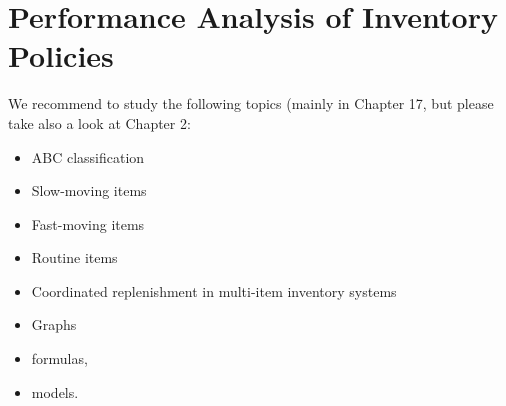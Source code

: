\section{Performance Analysis of Inventory Policies}

We recommend to study the following topics (mainly in Chapter 17, but please take also a look at Chapter 2:

\begin{itemize}
\item ABC classification
\item Slow-moving items
\item Fast-moving items
\item Routine items
\item Coordinated replenishment in multi-item inventory systems
\end{itemize}

\begin{itemize}
\item Graphs
\item formulas,
\item models.
\end{itemize}

